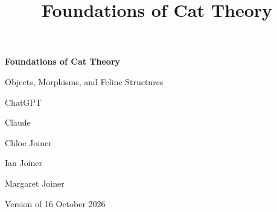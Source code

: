 \documentclass[11pt]{amsbook}
\title{Foundations of Cat Theory}
\begin{document}
\frontmatter

\begin{titlepage}
  \centering
  \vspace*{3cm}
  {\LARGE\bfseries Foundations of Cat Theory\par}
  \vspace{0.6cm}
  {\Large Objects, Morphisms, and Feline Structures\par}
  \vspace{2.5cm}
  {\large
    ChatGPT\par\medskip
    Claude\par\medskip
    Chloe Joiner\par\medskip
    Ian Joiner\par\medskip
    Margaret Joiner\par}
  \vfill
  {\small Version of 16 October 2026\par}
\end{titlepage}



\setcounter{tocdepth}{1}
\tableofcontents



\mainmatter
















\appendix



\backmatter

\end{document}
